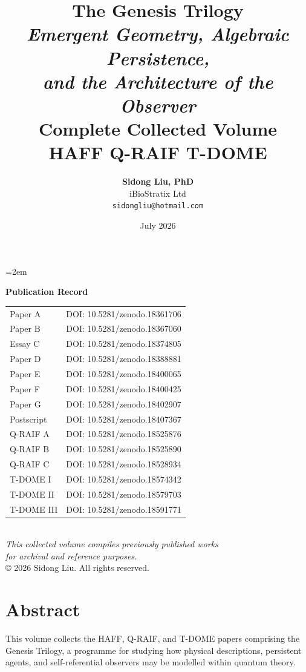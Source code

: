 \documentclass[12pt,a4paper,openany]{book}
\title{
  \vspace{-2cm}
  {\Huge\textbf{The Genesis Trilogy}}\\[1cm]
  {\Large\textit{Emergent Geometry, Algebraic Persistence,\\ and the Architecture of the Observer}}\\[2cm]
  {\large Complete Collected Volume}\\[0.5cm]
  {\normalsize HAFF \textperiodcentered{} Q-RAIF \textperiodcentered{} T-DOME}
}
\author{
  \textbf{Sidong Liu, PhD}\\[0.5em]
  iBioStratix Ltd\\[0.3em]
  \texttt{sidongliu@hotmail.com}
}
\date{July 2026}
\begin{document}
\emergencystretch=2em
\raggedbottom
{}

\frontmatter
\maketitle

\newpage
\thispagestyle{empty}
\vspace*{\fill}
\begin{center}
\textbf{Publication Record}\\[2em]
\begin{tabular}{ll}
Paper A & DOI: 10.5281/zenodo.18361706 \\
Paper B & DOI: 10.5281/zenodo.18367060 \\
Essay C & DOI: 10.5281/zenodo.18374805 \\
Paper D & DOI: 10.5281/zenodo.18388881 \\
Paper E & DOI: 10.5281/zenodo.18400065 \\
Paper F & DOI: 10.5281/zenodo.18400425 \\
Paper G & DOI: 10.5281/zenodo.18402907 \\
Postscript & DOI: 10.5281/zenodo.18407367 \\
Q-RAIF A & DOI: 10.5281/zenodo.18525876 \\
Q-RAIF B & DOI: 10.5281/zenodo.18525890 \\
Q-RAIF C & DOI: 10.5281/zenodo.18528934 \\
T-DOME I & DOI: 10.5281/zenodo.18574342 \\
T-DOME II & DOI: 10.5281/zenodo.18579703 \\
T-DOME III & DOI: 10.5281/zenodo.18591771 \\
\end{tabular}
\\[3em]
\textit{This collected volume compiles previously published works\\
for archival and reference purposes.}
\\[2em]
\copyright{} 2026 Sidong Liu. All rights reserved.
\end{center}
\vspace*{\fill}

\chapter*{Abstract}

This volume collects the HAFF, Q-RAIF, and T-DOME papers comprising the Genesis Trilogy, a programme for studying how physical descriptions, persistent agents, and self-referential observers may be modelled within quantum theory.
\end{document}
